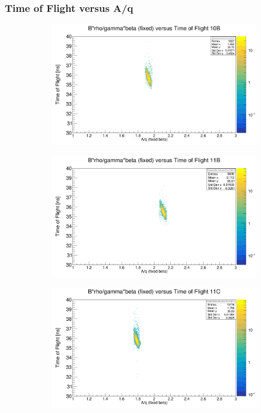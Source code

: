 \documentclass[12pt, letterpaper]{article}
\begin{document}
\subsubsection{Time of Flight versus A/q}
\begin{figure}[!htbp]
\begin{subfigure}{.5\textwidth}
  \centering
  \includegraphics[width=.9\linewidth]{aq_fix_tof10b.png}  
  \caption{}
  \label{fig:sub-first}
\end{subfigure}
\begin{subfigure}{.5\textwidth}
  \centering
  \includegraphics[width=.9\linewidth]{aq_fix_tof11b.png} 
  \caption{}
  \label{fig:sub-second}
\end{subfigure}
\begin{subfigure}{.5\textwidth}
  \centering
  \includegraphics[width=.9\linewidth]{aq_fix_tof11c.png} 

\end{subfigure}
\end{figure}
\end{document}
